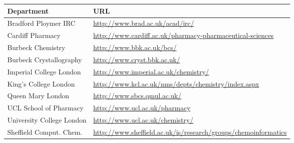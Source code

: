\begin{table}[H]
\begin{tabular}{||p{4cm}|Y||}
\hline
Department                         & URL \\
\hline
 \footnotesize{Bradford Ploymer IRC         }      & \footnotesize{\url{http://www.brad.ac.uk/acad/irc/}}                                                                                                      \\
 \footnotesize{Cardiff Pharmacy            }       & \footnotesize{\url{http://www.cardiff.ac.uk/pharmacy-pharmaceutical-sciences}}                                                                            \\
 \footnotesize{Burbeck Chemistry          }        & \footnotesize{\url{http://www.bbk.ac.uk/bcs/}}                                                                                                            \\
 \footnotesize{Burbeck Crystallography   }         & \footnotesize{\url{http://www.cryst.bbk.ac.uk/}}                                                                                                          \\
 \footnotesize{Imperial College London  }          & \footnotesize{\url{http://www.imperial.ac.uk/chemistry/}}                                                                                                 \\
 \footnotesize{King's College London   }           & \footnotesize{\url{http://www.kcl.ac.uk/nms/depts/chemistry/index.aspx}}                                                                                  \\
 \footnotesize{Queen Mary London      }            & \footnotesize{\url{http://www.sbcs.qmul.ac.uk/}}                                                                                                          \\
 \footnotesize{UCL School of Pharmacy}             & \footnotesize{\url{http://www.ucl.ac.uk/pharmacy}}                                                                                                        \\
 \footnotesize{University College London}          & \footnotesize{\url{http://www.ucl.ac.uk/chemistry/}}                                                                                                      \\
 \footnotesize{Sheffield Comput. Chem.}  & \footnotesize{\url{http://www.sheffield.ac.uk/is/research/groups/chemoinformatics}}                                                                       \\
\hline
\end{tabular}
\end{table}
